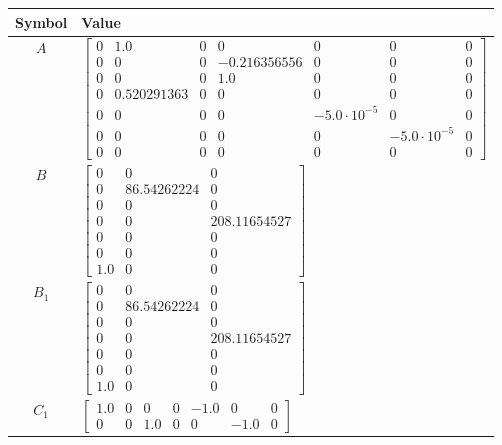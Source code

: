 \begin{tabular}{cl}
\hline
  Symbol  & Value                                                                                                                                                                                                                                                                                           \\
\hline
   $A$    & $\left[\begin{matrix}0 & 1.0 & 0 & 0 & 0 & 0 & 0\\0 & 0 & 0 & -0.216356556 & 0 & 0 & 0\\0 & 0 & 0 & 1.0 & 0 & 0 & 0\\0 & 0.520291363 & 0 & 0 & 0 & 0 & 0\\0 & 0 & 0 & 0 & -5.0 \cdot 10^{-5} & 0 & 0\\0 & 0 & 0 & 0 & 0 & -5.0 \cdot 10^{-5} & 0\\0 & 0 & 0 & 0 & 0 & 0 & 0\end{matrix}\right]$ \\
   $B$    & $\left[\begin{matrix}0 & 0 & 0\\0 & 86.54262224 & 0\\0 & 0 & 0\\0 & 0 & 208.11654527\\0 & 0 & 0\\0 & 0 & 0\\1.0 & 0 & 0\end{matrix}\right]$                                                                                                                                                     \\
 $B_{1}$  & $\left[\begin{matrix}0 & 0 & 0\\0 & 86.54262224 & 0\\0 & 0 & 0\\0 & 0 & 208.11654527\\0 & 0 & 0\\0 & 0 & 0\\1.0 & 0 & 0\end{matrix}\right]$                                                                                                                                                     \\
 $C_{1}$  & $\left[\begin{matrix}1.0 & 0 & 0 & 0 & -1.0 & 0 & 0\\0 & 0 & 1.0 & 0 & 0 & -1.0 & 0\end{matrix}\right]$                                                                                                                                                                                         \\

\end{tabular}
